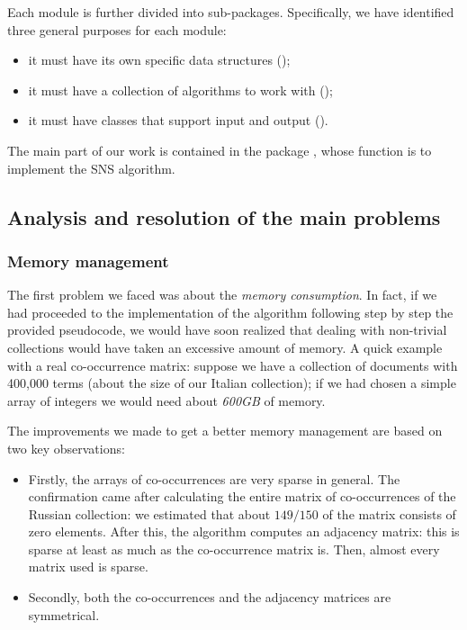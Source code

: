         Each module is further divided into sub-packages. Specifically, we have identified three general purposes for each module:
        \begin{itemize}
            \item it must have its own specific data structures ();
            \item it must have a collection of algorithms to work with ();
            \item it must have classes that support input and output ().
        \end{itemize}

        The main part of our work is contained in the package , whose function is to implement the SNS algorithm.

    \subsection{Analysis and resolution of the main problems}
        \subsubsection{Memory management}\label{sec:memory-management}
            The first problem we faced was about the \emph{memory consumption}. In fact, if we had proceeded to the implementation of the algorithm following step by step the provided pseudocode, we would have soon realized that dealing with non-trivial collections would have taken an excessive amount of memory. A quick example with a real co-occurrence matrix: suppose we have a collection of documents with 400,000 terms (about the size of our Italian collection); if we had chosen a simple array of integers we would need about \emph{600GB} of memory.

            The improvements we made to get a better memory management are based on two key observations:
            \begin{itemize}
                \item Firstly, the arrays of co-occurrences are very sparse in general. The confirmation came after calculating the entire matrix of co-occurrences of the Russian collection: we estimated that about \(149/150\) of the matrix consists of zero elements. After this, the algorithm computes an adjacency matrix: this is sparse at least as much as the co-occurrence matrix is. Then, almost every matrix used is sparse.
                \item Secondly, both the co-occurrences and the adjacency matrices are symmetrical.
            \end{itemize}

